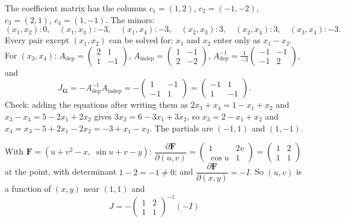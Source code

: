 \begin{solutions}
  \item The coefficient matrix has the columns $c_{1}=(1,2)$,
        $c_{2}=(-1,-2)$, $c_{3}=(2,1)$, $c_{4}=(1,-1)$. The minors:
        \[
          (x_{1},x_{2})\colon0,\quad(x_{1},x_{3})\colon-3,\quad
          (x_{1},x_{4})\colon-3,\quad(x_{2},x_{3})\colon3,\quad
          (x_{2},x_{4})\colon3,\quad(x_{3},x_{4})\colon-3 .
        \]
        Every pair except $(x_{1},x_{2})$ can be solved for; $x_{1}$ and
        $x_{2}$ enter only as $x_{1}-x_{2}$. For $(x_{3},x_{4})$:
        $A_{\mathrm{dep}}=\begin{pmatrix}2&1\\1&-1\end{pmatrix}$,
        $A_{\mathrm{indep}}=\begin{pmatrix}1&-1\\2&-2\end{pmatrix}$,
        $A_{\mathrm{dep}}^{-1}=\tfrac{1}{-3}\begin{pmatrix}-1&-1\\-1&2
        \end{pmatrix}$, and
        \[
          J_{\mathbf{G}}=-A_{\mathrm{dep}}^{-1}A_{\mathrm{indep}}
          =-\begin{pmatrix}1&-1\\-1&1\end{pmatrix}
          =\begin{pmatrix}-1&1\\1&-1\end{pmatrix} .
        \]
        Check: adding the equations after writing them as
        $2x_{3}+x_{4}=1-x_{1}+x_{2}$ and $x_{3}-x_{4}=5-2x_{1}+2x_{2}$ gives
        $3x_{3}=6-3x_{1}+3x_{2}$, so $x_{3}=2-x_{1}+x_{2}$ and
        $x_{4}=x_{3}-5+2x_{1}-2x_{2}=-3+x_{1}-x_{2}$. The partials are
        $(-1,1)$ and $(1,-1)$. \checkmark
  \item With $\mathbf{F}=(u+v^{2}-x,\;\sin u+v-y)$:
        $\dfrac{\partial\mathbf{F}}{\partial(u,v)}=\begin{pmatrix}1&2v\\
        \cos u&1\end{pmatrix}=\begin{pmatrix}1&2\\1&1\end{pmatrix}$ at the
        point, with determinant $1-2=-1\neq0$; and
        $\dfrac{\partial\mathbf{F}}{\partial(x,y)}=-I$. So $(u,v)$ is a
        function of $(x,y)$ near $(1,1)$ and
        \[
          J=-\begin{pmatrix}1&2\\1&1\end{pmatrix}^{-1}(-I)
\]
\end{solutions}
